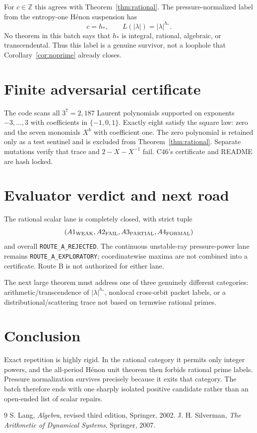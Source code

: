\documentclass[11pt]{article}
\theoremstyle{remark}\newtheorem{remark}[theorem]{Remark}
\begin{document}
For $c\in\mathbb Z$ this agrees with Theorem~\ref{thm:rational}.  The
pressure-normalized label from the entropy-one H\'enon suspension has
\[
c=h_*,\qquad L(|\lambda|)=|\lambda|^{h_*}.
\]
No theorem in this batch says that $h_*$ is integral, rational, algebraic, or
transcendental.  Thus this label is a genuine survivor, not a loophole that
Corollary~\ref{cor:noprime} already closes.

\section{Finite adversarial certificate}
The code scans all $3^7=2{,}187$ Laurent polynomials supported on exponents
$-3,\ldots,3$ with coefficients in $\{-1,0,1\}$.  Exactly eight satisfy the
square law: zero and the seven monomials $X^k$ with coefficient one.  The
zero polynomial is retained only as a test sentinel and is excluded from
Theorem~\ref{thm:rational}.  Separate mutations verify that trace and
$2-X-X^{-1}$ fail.  C46's certificate and README are hash locked.

\section{Evaluator verdict and next road}
The rational scalar lane is completely closed, with strict tuple
\[
(A1_{\rm WEAK},A2_{\rm FAIL},A3_{\rm PARTIAL},A4_{\rm FORMAL})
\]
and overall \texttt{ROUTE\_A\_REJECTED}.  The continuous unstable-ray
pressure-power lane remains \texttt{ROUTE\_A\_EXPLORATORY}; coordinatewise maxima are not combined into
a certificate.  Route B is not authorized for either lane.

The next large theorem must address one of three genuinely different
categories: arithmetic/transcendence of $|\lambda|^{h_*}$, nonlocal
cross-orbit packet labels, or a distributional/scattering trace not based on
termwise rational primes.

\section{Conclusion}
Exact repetition is highly rigid.  In the rational category it permits only
integer powers, and the all-period H\'enon unit theorem then forbids rational
prime labels.  Pressure normalization survives precisely because it exits
that category.  The batch therefore ends with one sharply isolated positive
candidate rather than an open-ended list of scalar repairs.

\begin{thebibliography}{9}
S. Lang, \emph{Algebra}, revised third edition, Springer, 2002.
J. H. Silverman, \emph{The Arithmetic of Dynamical Systems}, Springer, 2007.
\end{thebibliography}
\end{document}
